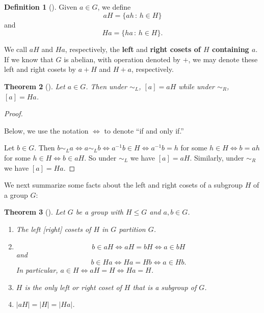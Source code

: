 \documentclass[10pt,]{book}
\newcommand{\terminology}[1]{\textbf{#1}}
\theoremstyle{plain}
\newtheorem{theorem}{Theorem}[section]
\theoremstyle{definition}
\newtheorem{definition}[theorem]{Definition}
\theoremstyle{definition}
\theoremstyle{definition}
\theoremstyle{definition}
\numberwithin{equation}{section}
\def\siml{\sim_L}
\def\simr{\sim_R}
\begin{document}
\begin{definition}[{}]\label{definition-61}
Given \(a\in G\), we define%
\begin{equation*}
aH =
\{ah\,:\, h\in H\}
\end{equation*}
and%
\begin{equation*}
Ha=\{ha\,:\,h\in H\}.
\end{equation*}
%
\par
We call \(aH\) and \(Ha\), respectively, the \terminology{left} and \terminology{right cosets of \(H\) containing \(a\)}. If we know that \(G\) is abelian, with operation denoted by \(+\), we may denote these left and right cosets by \(a+H\) and \(H+a\), respectively.%
%
\label{notation-36}
\label{notation-37}
\end{definition}
\begin{theorem}[{}]\label{equivca}
Let \(a\in G\). Then under \(\siml\), \([a]=aH\) while under \(\simr\), \([a]=Ha\).%
\label{notation-38}
\end{theorem}
\begin{proof}\hypertarget{proof-38}{}
Below, we use the notation \(\Leftrightarrow\) to denote ``if and only if.''%
\par
Let \(b\in G\). Then \(b\siml a \Leftrightarrow a \siml b
\Leftrightarrow a^{-1}b\in H \Leftrightarrow a^{-1}b=h\) for some \(h\in H \Leftrightarrow b=ah\) for some \(h\in H \Leftrightarrow b\in
aH\). So under \(\siml\) we have \([a]=aH\). Similarly, under \(\simr\) we have \([a]=Ha\).%
\end{proof}
We next summarize some facts about the left and right cosets of a subgroup \(H\) of a group \(G\):%
\begin{theorem}[{}]\label{cosetfacts}
Let \(G\) be a group with \(H\leq G\) and \(a,b\in G\). \leavevmode%
\begin{enumerate}
\item\hypertarget{li-411}{}The left [right] cosets of \(H\) in \(G\) partition \(G\).%
\item\hypertarget{li-412}{}%
\begin{equation*}
b\in aH \Leftrightarrow aH=bH \Leftrightarrow  a\in bH
\end{equation*}
and%
\begin{equation*}
b\in Ha \Leftrightarrow  Ha=Hb \Leftrightarrow  a\in
Hb.
\end{equation*}
In particular, \(a\in H \Leftrightarrow aH=H \Leftrightarrow Ha=H\).%
\item\hypertarget{li-413}{}\(H\) is the only left or right coset of \(H\) that is a \emph{subgroup} of \(G\).%
\item\hypertarget{li-414}{}\(|aH|=|H|=|Ha|\).%
\end{enumerate}
%
\end{theorem}
\end{document}
